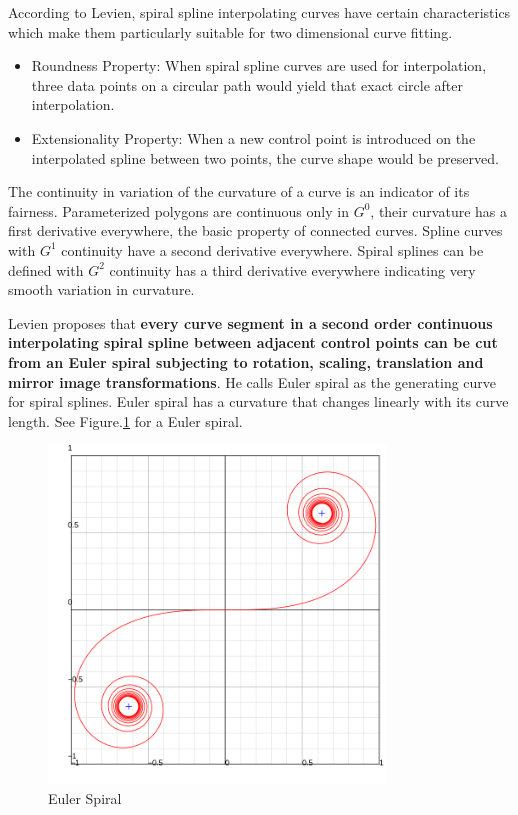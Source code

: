 \documentclass[10pt]{article}
\begin{document}
According to Levien, spiral spline interpolating curves have certain characteristics which make them particularly suitable for two dimensional curve fitting.
\begin{itemize}
	
	\item Roundness Property: When spiral spline curves are used for interpolation, three data points on a circular path would yield that exact circle after interpolation.
	\item Extensionality Property: When a new control point is introduced on the interpolated spline between two points, the curve shape would be preserved.
\end{itemize}

The continuity in variation of the curvature of a curve is an indicator of its fairness. Parameterized polygons are continuous only in $G^0$, their curvature has a first derivative everywhere, the basic property of connected curves. Spline curves with $G^1$ continuity have a second derivative everywhere. Spiral splines can be defined with $G^2$ continuity has a third derivative everywhere indicating very smooth variation in curvature. 
 
Levien proposes that \textbf{every curve segment in a second order continuous interpolating spiral spline between adjacent control points can be cut from an Euler spiral subjecting to rotation, scaling, translation and mirror image transformations}. He calls Euler spiral as the generating curve for spiral splines. Euler spiral has a curvature that changes linearly with its curve length. See Figure.\ref{eulerspiral} for a Euler spiral.


\begin{figure}
	\centering
	\includegraphics[width=0.8\textwidth]{images/Euler_spiral.png}
	\caption{Euler Spiral}
	\label{eulerspiral}
\end{figure}
\end{document}
